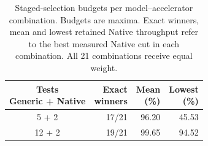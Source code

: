 \begin{table}[t]
\centering\small
\caption{Staged-selection budgets per model--accelerator combination. Budgets are maxima. Exact winners, mean and lowest retained Native throughput refer to the best measured Native cut in each combination. All 21 combinations receive equal weight.}
\label{tab:staged-budget}
\setlength{\tabcolsep}{3pt}
\begin{tabular*}{\columnwidth}{@{\extracolsep{\fill}}crrr@{}}
\toprule
\shortstack{Tests\\Generic + Native} & \shortstack{Exact\\winners} & \shortstack{Mean\\(\%)} & \shortstack{Lowest\\(\%)} \\
\midrule
5 + 2 & 17/21 & 96.20 & 45.53 \\
12 + 2 & 19/21 & 99.65 & 94.52 \\
\bottomrule
\end{tabular*}
\end{table}
